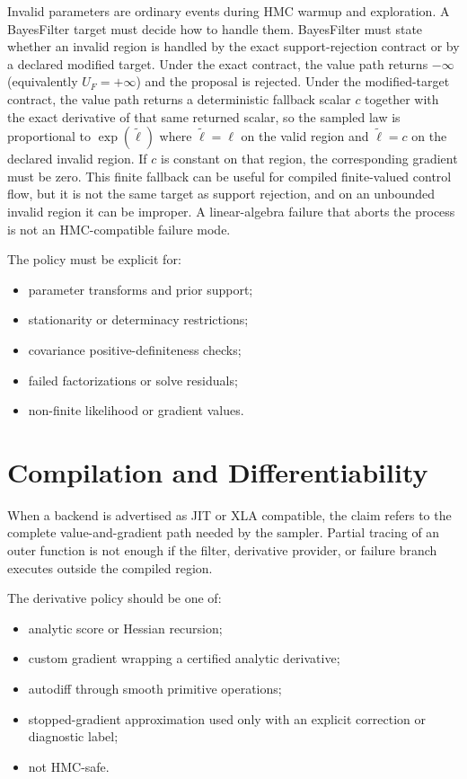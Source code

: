 Invalid parameters are ordinary events during HMC warmup and exploration.  A
BayesFilter target must decide how to handle them.  BayesFilter must state whether an invalid region is handled by the exact support-rejection contract or by a declared modified target. Under the exact contract, the value path returns $-\infty$ (equivalently $U_F=+\infty$) and the proposal is rejected. Under the modified-target contract, the value path returns a deterministic fallback scalar $c$ together with the exact derivative of that same returned scalar, so the sampled law is proportional to $\exp(\widetilde\ell)$ where $\widetilde\ell=\ell$ on the valid region and $\widetilde\ell=c$ on the declared invalid region. If $c$ is constant on that region, the corresponding gradient must be zero. This finite fallback can be useful for compiled finite-valued control flow, but it is not the same target as support rejection, and on an unbounded invalid region it can be improper. A linear-algebra failure that aborts the process is not an HMC-compatible failure mode.

The policy must be explicit for:
\begin{itemize}
  \item parameter transforms and prior support;
  \item stationarity or determinacy restrictions;
  \item covariance positive-definiteness checks;
  \item failed factorizations or solve residuals;
  \item non-finite likelihood or gradient values.
\end{itemize}

\section{Compilation and Differentiability}
\label{sec:bf-hmc-target-compilation}

When a backend is advertised as JIT or XLA compatible, the claim refers to the
complete value-and-gradient path needed by the sampler.  Partial tracing of an
outer function is not enough if the filter, derivative provider, or failure
branch executes outside the compiled region.

The derivative policy should be one of:
\begin{itemize}
  \item analytic score or Hessian recursion;
  \item custom gradient wrapping a certified analytic derivative;
  \item autodiff through smooth primitive operations;
  \item stopped-gradient approximation used only with an explicit correction or
    diagnostic label;
  \item not HMC-safe.
\end{itemize}
